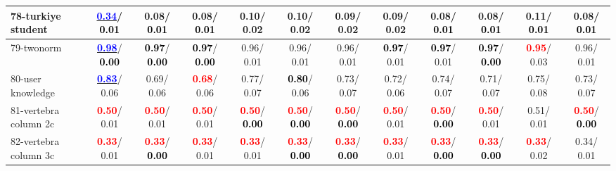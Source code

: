 \begin{table}[h]
\begin{center}
{\begin{tabular}{lc|c|c|c|c|c|c|c|c|c|c}
78-turkiye student & \underline{\textcolor{blue}{\textbf{  0.34}}}/\textcolor{black}{\textbf{  0.01}} &   0.08/\textcolor{black}{\textbf{  0.01}} &   0.08/\textcolor{black}{\textbf{  0.01}} &   0.10/  0.02 &   0.10/  0.02 &   0.09/  0.02 &   0.09/  0.02 &   0.08/\textcolor{black}{\textbf{  0.01}} &   0.08/\textcolor{black}{\textbf{  0.01}} &   0.11/\textcolor{black}{\textbf{  0.01}} &   0.08/\textcolor{black}{\textbf{  0.01}} \\ \hline
79-twonorm & \underline{\textcolor{blue}{\textbf{  0.98}}}/\textcolor{black}{\textbf{  0.00}} & \textcolor{black}{\textbf{  0.97}}/\textcolor{black}{\textbf{  0.00}} & \textcolor{black}{\textbf{  0.97}}/\textcolor{black}{\textbf{  0.00}} &   0.96/  0.01 &   0.96/  0.01 &   0.96/  0.01 & \textcolor{black}{\textbf{  0.97}}/  0.01 & \textcolor{black}{\textbf{  0.97}}/  0.01 & \textcolor{black}{\textbf{  0.97}}/\textcolor{black}{\textbf{  0.00}} & \textcolor{red}{\textbf{  0.95}}/  0.03 &   0.96/  0.01 \\
80-user knowledge & \underline{\textcolor{blue}{\textbf{  0.83}}}/  0.06 &   0.69/  0.06 & \textcolor{red}{\textbf{  0.68}}/  0.06 &   0.77/  0.07 & \textcolor{black}{\textbf{  0.80}}/  0.06 &   0.73/  0.07 &   0.72/  0.06 &   0.74/  0.07 &   0.71/  0.07 &   0.75/  0.08 &   0.73/  0.07 \\
81-vertebra column 2c & \textcolor{red}{\textbf{  0.50}}/  0.01 & \textcolor{red}{\textbf{  0.50}}/  0.01 & \textcolor{red}{\textbf{  0.50}}/  0.01 & \textcolor{red}{\textbf{  0.50}}/\textcolor{black}{\textbf{  0.00}} & \textcolor{red}{\textbf{  0.50}}/\textcolor{black}{\textbf{  0.00}} & \textcolor{red}{\textbf{  0.50}}/\textcolor{black}{\textbf{  0.00}} & \textcolor{red}{\textbf{  0.50}}/  0.01 & \textcolor{red}{\textbf{  0.50}}/\textcolor{black}{\textbf{  0.00}} & \textcolor{red}{\textbf{  0.50}}/  0.01 &   0.51/  0.01 & \textcolor{red}{\textbf{  0.50}}/\textcolor{black}{\textbf{  0.00}} \\
82-vertebra column 3c & \textcolor{red}{\textbf{  0.33}}/  0.01 & \textcolor{red}{\textbf{  0.33}}/\textcolor{black}{\textbf{  0.00}} & \textcolor{red}{\textbf{  0.33}}/  0.01 & \textcolor{red}{\textbf{  0.33}}/  0.01 & \textcolor{red}{\textbf{  0.33}}/\textcolor{black}{\textbf{  0.00}} & \textcolor{red}{\textbf{  0.33}}/\textcolor{black}{\textbf{  0.00}} & \textcolor{red}{\textbf{  0.33}}/  0.01 & \textcolor{red}{\textbf{  0.33}}/\textcolor{black}{\textbf{  0.00}} & \textcolor{red}{\textbf{  0.33}}/\textcolor{black}{\textbf{  0.00}} & \textcolor{red}{\textbf{  0.33}}/  0.02 &   0.34/  0.01 \\

\end{tabular}}
\end{center}
\end{table}
